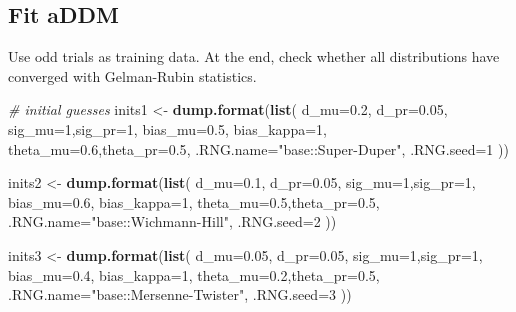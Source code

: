 \documentclass[
]{book}
\newenvironment{Shaded}{\begin{snugshade}}{\end{snugshade}}
\newcommand{\AttributeTok}[1]{\textcolor[rgb]{0.13,0.29,0.53}{#1}}
\newcommand{\CommentTok}[1]{\textcolor[rgb]{0.56,0.35,0.01}{\textit{#1}}}
\newcommand{\DecValTok}[1]{\textcolor[rgb]{0.00,0.00,0.81}{#1}}
\newcommand{\FloatTok}[1]{\textcolor[rgb]{0.00,0.00,0.81}{#1}}
\newcommand{\FunctionTok}[1]{\textcolor[rgb]{0.13,0.29,0.53}{\textbf{#1}}}
\newcommand{\NormalTok}[1]{#1}
\newcommand{\OtherTok}[1]{\textcolor[rgb]{0.56,0.35,0.01}{#1}}
\newcommand{\StringTok}[1]{\textcolor[rgb]{0.31,0.60,0.02}{#1}}
\begin{document}
\hypertarget{fit-addm}{%
\subsection{Fit aDDM}\label{fit-addm}}

Use odd trials as training data. At the end, check whether all distributions have converged with Gelman-Rubin statistics.

\begin{Shaded}
\begin{Highlighting}[]
\CommentTok{\# initial guesses}
\NormalTok{inits1 }\OtherTok{\textless{}{-}} \FunctionTok{dump.format}\NormalTok{(}\FunctionTok{list}\NormalTok{( }
  \AttributeTok{d\_mu=}\FloatTok{0.2}\NormalTok{, }\AttributeTok{d\_pr=}\FloatTok{0.05}\NormalTok{,}
  \AttributeTok{sig\_mu=}\DecValTok{1}\NormalTok{,}\AttributeTok{sig\_pr=}\DecValTok{1}\NormalTok{,}
  \AttributeTok{bias\_mu=}\FloatTok{0.5}\NormalTok{, }\AttributeTok{bias\_kappa=}\DecValTok{1}\NormalTok{,}
  \AttributeTok{theta\_mu=}\FloatTok{0.6}\NormalTok{,}\AttributeTok{theta\_pr=}\FloatTok{0.5}\NormalTok{,}
  \AttributeTok{.RNG.name=}\StringTok{"base::Super{-}Duper"}\NormalTok{, }\AttributeTok{.RNG.seed=}\DecValTok{1}
\NormalTok{))}

\NormalTok{inits2 }\OtherTok{\textless{}{-}} \FunctionTok{dump.format}\NormalTok{(}\FunctionTok{list}\NormalTok{( }
  \AttributeTok{d\_mu=}\FloatTok{0.1}\NormalTok{, }\AttributeTok{d\_pr=}\FloatTok{0.05}\NormalTok{,}
  \AttributeTok{sig\_mu=}\DecValTok{1}\NormalTok{,}\AttributeTok{sig\_pr=}\DecValTok{1}\NormalTok{,}
  \AttributeTok{bias\_mu=}\FloatTok{0.6}\NormalTok{, }\AttributeTok{bias\_kappa=}\DecValTok{1}\NormalTok{,}
  \AttributeTok{theta\_mu=}\FloatTok{0.5}\NormalTok{,}\AttributeTok{theta\_pr=}\FloatTok{0.5}\NormalTok{,}
  \AttributeTok{.RNG.name=}\StringTok{"base::Wichmann{-}Hill"}\NormalTok{, }\AttributeTok{.RNG.seed=}\DecValTok{2}
\NormalTok{))}

\NormalTok{inits3 }\OtherTok{\textless{}{-}} \FunctionTok{dump.format}\NormalTok{(}\FunctionTok{list}\NormalTok{( }
  \AttributeTok{d\_mu=}\FloatTok{0.05}\NormalTok{, }\AttributeTok{d\_pr=}\FloatTok{0.05}\NormalTok{,}
  \AttributeTok{sig\_mu=}\DecValTok{1}\NormalTok{,}\AttributeTok{sig\_pr=}\DecValTok{1}\NormalTok{,}
  \AttributeTok{bias\_mu=}\FloatTok{0.4}\NormalTok{, }\AttributeTok{bias\_kappa=}\DecValTok{1}\NormalTok{,}
  \AttributeTok{theta\_mu=}\FloatTok{0.2}\NormalTok{,}\AttributeTok{theta\_pr=}\FloatTok{0.5}\NormalTok{,}
  \AttributeTok{.RNG.name=}\StringTok{"base::Mersenne{-}Twister"}\NormalTok{, }\AttributeTok{.RNG.seed=}\DecValTok{3}
\NormalTok{))}


\end{Highlighting}
\end{Shaded}
\end{document}
